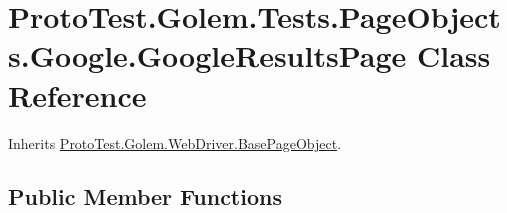 \hypertarget{class_proto_test_1_1_golem_1_1_tests_1_1_page_objects_1_1_google_1_1_google_results_page}{\section{Proto\-Test.\-Golem.\-Tests.\-Page\-Objects.\-Google.\-Google\-Results\-Page Class Reference}
\label{class_proto_test_1_1_golem_1_1_tests_1_1_page_objects_1_1_google_1_1_google_results_page}
}


Inherits \hyperlink{class_proto_test_1_1_golem_1_1_web_driver_1_1_base_page_object}{Proto\-Test.\-Golem.\-Web\-Driver.\-Base\-Page\-Object}.

\subsection*{Public Member Functions}
